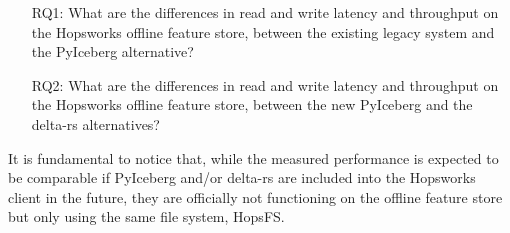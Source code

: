 \begin{enumerate}
    \item[RQ1:] What are the differences in read and write latency and throughput on the Hopsworks offline feature store, between the existing legacy system and the PyIceberg alternative?
    \item[RQ2:] What are the differences in read and write latency and throughput on the Hopsworks offline feature store, between the new PyIceberg and the delta-rs alternatives?
\end{enumerate}

It is fundamental to notice that, while the measured performance is expected to be comparable if PyIceberg and/or delta-rs are included into the Hopsworks client in the future, they are officially not functioning on the offline feature store but only using the same file system, \gls{HopsFS}.